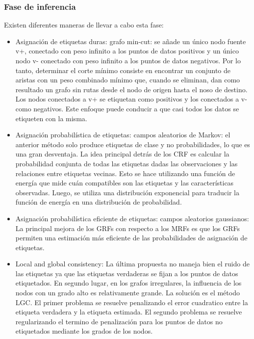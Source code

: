 \subsubsection{Fase de inferencia}
Existen diferentes maneras de llevar a cabo esta fase:
\begin{itemize}
	\item Asignación de etiquetas duras: grafo min-cut: se añade un único nodo fuente v+, conectado con peso infinito a los puntos de datos positivos y un único nodo v- conectado con peso infinito a los puntos de datos negativos. Por lo tanto, determinar el corte mínimo consiste en encontrar un conjunto de aristas con un peso combinado mínimo que, cuando se eliminan, dan como resultado un grafo sin rutas desde el nodo de origen hasta el noso de destino. Los nodos conectados a v+ se etiquetan como positivos y los conectados a v- como negativos. Este enfoque puede conducir a que casi todos los datos se etiqueten con la misma.
	\item Asignación probabilística de etiquetas: campos aleatorios de Markov: el anterior método solo produce etiquetas de clase y no probabilidades, lo que es una gran desventaja. La idea principal detrás de los CRF es calcular la probabilidad conjunta de todas las etiquetas dadas las observaciones y las relaciones entre etiquetas vecinas. Esto se hace utilizando una función de energía que mide cuán compatibles son las etiquetas y las características observadas. Luego, se utiliza una distribución exponencial para traducir la función de energía en una distribución de probabilidad.
	\item Asignación probabilística eficiente de etiquetas: campos aleatorios gaussianos: La principal mejora de los GRFs con respecto a los MRFs es que los GRFs permiten una estimación más eficiente de las probabilidades de asignación de etiquetas.
	\item Local and global consistency: La última propuesta no maneja bien el ruido de las etiquetas ya que las etiquetas verdaderas se fijan a los puntos de datos etiquetados. En segundo lugar, en los grafos irregulares, la influencia de los nodos con un grado alto es relativamente grande. La solución es el método LGC. El primer problema se resuelve penalizando el error cuadratico entre la etiqueta verdadera y la etiqueta estimada. El segundo problema se resuelve regularizando el termino de penalización para los puntos de datos no etiquetados mediante los grados de los nodos.
	
\end{itemize}


